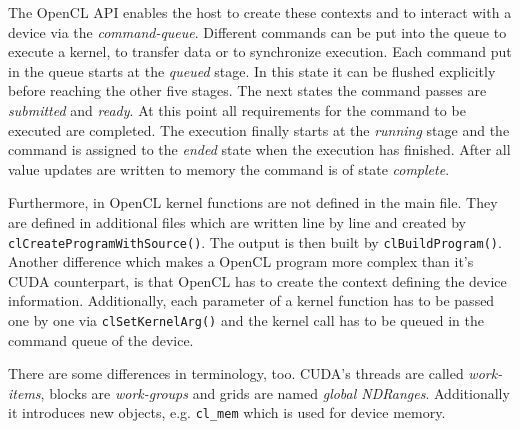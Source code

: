 \documentclass[a4paper,12pt]{llncs}
\numberwithin{equation}{section}
\begin{document}
  The OpenCL API enables the host to create these contexts and to interact with a device via the \textit{command-queue}.
  Different commands can be put into the queue to execute a kernel, to transfer data or to synchronize execution.
  Each command put in the queue starts at the \textit{queued} stage.
  In this state it can be flushed explicitly before reaching the other five stages.
  The next states the command passes are \textit{submitted} and \textit{ready}.
  At this point all requirements for the command to be executed are completed.
  The execution finally starts at the \textit{running} stage and the command is assigned to the \textit{ended} state when the execution has finished.
  After all value updates are written to memory the command is of state \textit{complete}.
  
  Furthermore, in OpenCL kernel functions are not defined in the main file.
  They are defined in additional files which are written line by line and created by \texttt{clCreateProgramWithSource()}.
  The output is then built by \texttt{clBuildProgram()}.
  Another difference which makes a OpenCL program more complex than it's CUDA counterpart, is that OpenCL has to create the context defining the device information.
  Additionally, each parameter of a kernel function has to be passed one by one via \texttt{clSetKernelArg()} and the kernel call has to be queued in the command queue of the device.
      
  There are some differences in terminology, too.
  CUDA's threads are called \textit{work-items}, blocks are \textit{work-groups} and grids are named \textit{global NDRanges}.
  Additionally it introduces new objects, e.g. \texttt{cl\_mem} which is used for device memory.
  
  



\end{document}
